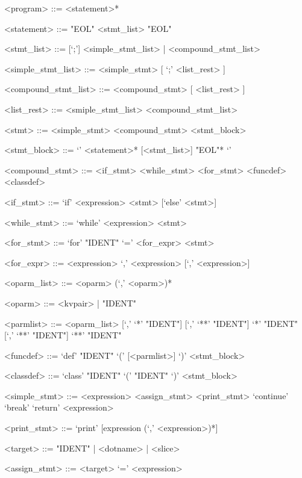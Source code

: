 \documentclass[10pt,a4paper]{article}
\begin{document}
\setlength{\grammarparsep}{10pt plus 1pt minus 1pt} %
\setlength{\grammarindent}{12em} %
\begin{grammar}


<program> ::= <statement>*

<statement> ::= "EOL" 
    \alt <stmt_list> "EOL"

<stmt_list> ::= [`;'] <simple_stmt_list> | <compound_stmt_list>

<simple_stmt_list> ::= <simple_stmt> [ `;' <list_rest> ]

<compound_stmt_list> ::= <compound_stmt> [ <list_rest> ]

<list_rest> ::= <smiple_stmt_list> 
    \alt <compound_stmt_list>

<stmt> ::= <simple_stmt> 
    \alt <compound_stmt> 
    \alt <stmt_block>

<stmt_block> ::= `{' <statement>* [<stmt_list>] "EOL"* `}'

<compound_stmt> ::= <if_stmt>
	\alt <while_stmt>
	\alt <for_stmt>
	\alt <funcdef>
    \alt <classdef>
	
<if_stmt> ::= `if' <expression> <stmt> [`else' <stmt>]
              
<while_stmt> ::= `while' <expression> <stmt>

<for_stmt> ::= `for' "IDENT" `=' <for_expr> <stmt>

<for_expr> ::= <expression> `,' <expression> [`,' <expression>]

<oparm_list> ::= <oparm> (`,' <oparm>)*

<oparm> ::= <kvpair> | "IDENT"

<parmlist> ::= <oparm_list> [`,' `*' "IDENT"] [`,' `**' "IDENT"]
    \alt `*' "IDENT" [`,' `**' "IDENT"]
    \alt `**' "IDENT"

<funcdef> ::= `def' "IDENT" `(' [<parmlist>] `)' <stmt_block>

<classdef> ::= `class' "IDENT" `(' "IDENT" `)' <stmt_block>

<simple_stmt> ::= <expression>
	\alt <assign_stmt>                    
	\alt <print_stmt>
	\alt `continue'
	\alt `break'
	\alt `return' <expression>
	
<print_stmt> ::= `print' [expression (`,' <expression>)*]

<target> ::= "IDENT" | <dotname> | <slice>

<assign_stmt> ::= <target> `=' <expression>


\end{grammar}
\end{document}
